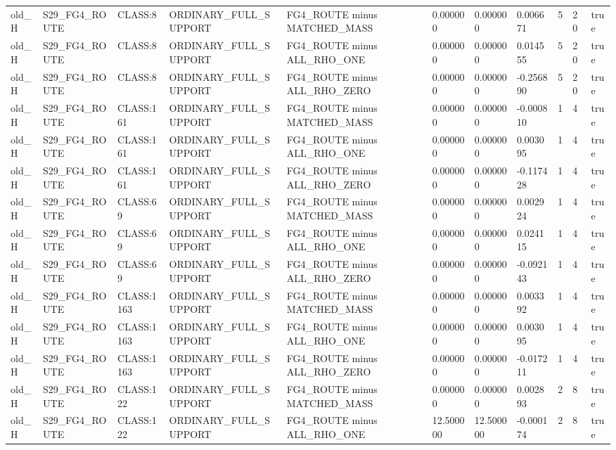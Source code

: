 \begin{tabular}{lllllllllll}
old\_H & S29\_FG4\_ROUTE & CLASS:8 & ORDINARY\_FULL\_SUPPORT & FG4\_ROUTE minus MATCHED\_MASS & 0.000000 & 0.000000 & 0.006671 & 5 & 20 & true \\
old\_H & S29\_FG4\_ROUTE & CLASS:8 & ORDINARY\_FULL\_SUPPORT & FG4\_ROUTE minus ALL\_RHO\_ONE & 0.000000 & 0.000000 & 0.014555 & 5 & 20 & true \\
old\_H & S29\_FG4\_ROUTE & CLASS:8 & ORDINARY\_FULL\_SUPPORT & FG4\_ROUTE minus ALL\_RHO\_ZERO & 0.000000 & 0.000000 & -0.256890 & 5 & 20 & true \\
old\_H & S29\_FG4\_ROUTE & CLASS:161 & ORDINARY\_FULL\_SUPPORT & FG4\_ROUTE minus MATCHED\_MASS & 0.000000 & 0.000000 & -0.000810 & 1 & 4 & true \\
old\_H & S29\_FG4\_ROUTE & CLASS:161 & ORDINARY\_FULL\_SUPPORT & FG4\_ROUTE minus ALL\_RHO\_ONE & 0.000000 & 0.000000 & 0.003095 & 1 & 4 & true \\
old\_H & S29\_FG4\_ROUTE & CLASS:161 & ORDINARY\_FULL\_SUPPORT & FG4\_ROUTE minus ALL\_RHO\_ZERO & 0.000000 & 0.000000 & -0.117428 & 1 & 4 & true \\
old\_H & S29\_FG4\_ROUTE & CLASS:69 & ORDINARY\_FULL\_SUPPORT & FG4\_ROUTE minus MATCHED\_MASS & 0.000000 & 0.000000 & 0.002924 & 1 & 4 & true \\
old\_H & S29\_FG4\_ROUTE & CLASS:69 & ORDINARY\_FULL\_SUPPORT & FG4\_ROUTE minus ALL\_RHO\_ONE & 0.000000 & 0.000000 & 0.024115 & 1 & 4 & true \\
old\_H & S29\_FG4\_ROUTE & CLASS:69 & ORDINARY\_FULL\_SUPPORT & FG4\_ROUTE minus ALL\_RHO\_ZERO & 0.000000 & 0.000000 & -0.092143 & 1 & 4 & true \\
old\_H & S29\_FG4\_ROUTE & CLASS:1163 & ORDINARY\_FULL\_SUPPORT & FG4\_ROUTE minus MATCHED\_MASS & 0.000000 & 0.000000 & 0.003392 & 1 & 4 & true \\
old\_H & S29\_FG4\_ROUTE & CLASS:1163 & ORDINARY\_FULL\_SUPPORT & FG4\_ROUTE minus ALL\_RHO\_ONE & 0.000000 & 0.000000 & 0.003095 & 1 & 4 & true \\
old\_H & S29\_FG4\_ROUTE & CLASS:1163 & ORDINARY\_FULL\_SUPPORT & FG4\_ROUTE minus ALL\_RHO\_ZERO & 0.000000 & 0.000000 & -0.017211 & 1 & 4 & true \\
old\_H & S29\_FG4\_ROUTE & CLASS:122 & ORDINARY\_FULL\_SUPPORT & FG4\_ROUTE minus MATCHED\_MASS & 0.000000 & 0.000000 & 0.002893 & 2 & 8 & true \\
old\_H & S29\_FG4\_ROUTE & CLASS:122 & ORDINARY\_FULL\_SUPPORT & FG4\_ROUTE minus ALL\_RHO\_ONE & 12.500000 & 12.500000 & -0.000174 & 2 & 8 & true \\

\end{tabular}
